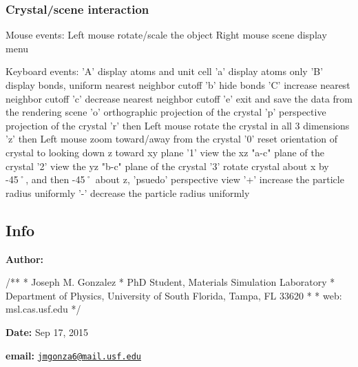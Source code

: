 \subsubsection*{Crystal/scene interaction}

\begin{DoxyVerb}    Mouse events:
      Left mouse            rotate/scale the object
      Right mouse           scene display menu
  
    Keyboard events:
      'A'                   display atoms and unit cell
      'a'                   display atoms only
      'B'                   display bonds, uniform nearest neighbor cutoff
      'b'                   hide bonds
      'C'                   increase nearest neighbor cutoff
      'c'                   decrease nearest neighbor cutoff
      'e'                   exit and save the data from the rendering scene
      'o'                   orthographic projection of the crystal
      'p'                   perspective projection of the crystal
      'r' then Left mouse   rotate the crystal in all 3 dimensions
      'z' then Left mouse   zoom toward/away from the crystal
      '0'                   reset orientation of crystal to looking down z toward xy plane
      '1'                   view the xz "a-c" plane of the crystal
      '2'                   view the yz "b-c" plane of the crystal
      '3'                   rotate crystal about x by -45˚, and then -45˚ about z, 'psuedo' perspective view
      '+'                   increase the particle radius uniformly
      '-'                   decrease the particle radius uniformly
\end{DoxyVerb}
 



\subsection*{Info }

{\bfseries Author\+:} \begin{DoxyVerb}/**
  * Joseph M. Gonzalez
  * PhD Student, Materials Simulation Laboratory
  * Department of Physics, University of South Florida, Tampa, FL 33620
  *
  * web: msl.cas.usf.edu
  */
\end{DoxyVerb}


{\bfseries Date\+:} Sep 17, 2015

{\bfseries email\+:} \href{mailto:jmgonza6@mail.usf.edu}{\tt jmgonza6@mail.\+usf.\+edu} 